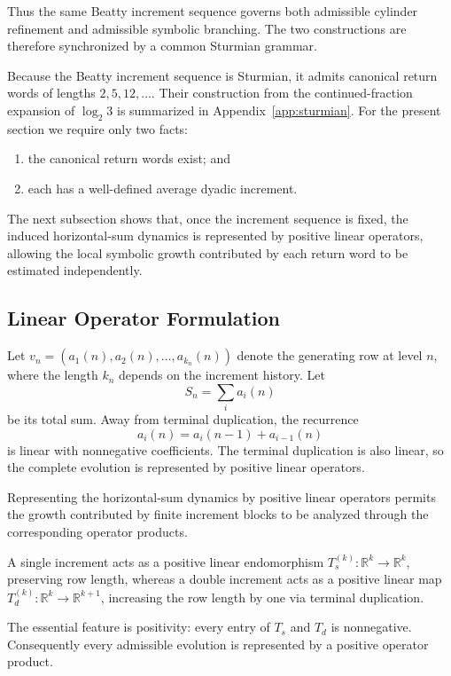 \documentclass[12pt, oneside]{article}
\numberwithin{equation}{section}
\theoremstyle{definition}
\theoremstyle{plain}
\theoremstyle{remark}
\begin{document}
Thus the same Beatty increment sequence governs both admissible cylinder
refinement and admissible symbolic branching. The two constructions are
therefore synchronized by a common Sturmian grammar.

Because the Beatty increment sequence is Sturmian, it admits canonical
return words of lengths \(2,5,12,\ldots\). Their construction from the
continued-fraction expansion of \(\log_2 3\) is summarized in
Appendix~\ref{app:sturmian}. For the present section we require only two
facts:

\begin{enumerate}
\item the canonical return words exist; and
\item each has a well-defined average dyadic increment.
\end{enumerate}

The next subsection shows that, once the increment sequence is fixed,
the induced horizontal-sum dynamics is represented by positive linear
operators, allowing the local symbolic growth contributed by each return
word to be estimated independently.

\subsection{Linear Operator Formulation}

Let $v_n = (a_1(n),a_2(n),\dots,a_{k_n}(n))$ denote the generating row at
level $n$, where the length $k_n$ depends on the increment history.
Let
\[
S_n = \sum_i a_i(n)
\]
be its total sum. Away from terminal duplication, the recurrence
\[
a_i(n)=a_i(n-1)+a_{i-1}(n)
\]
is linear with nonnegative coefficients. The terminal duplication is also
linear, so the complete evolution is represented by positive linear operators.

Representing the horizontal-sum dynamics by positive linear operators permits the
growth contributed by finite increment blocks to be analyzed through the corresponding
operator products.

A single increment acts as a positive linear endomorphism
$T_s^{(k)} : \mathbb{R}^{k} \to \mathbb{R}^{k}$, preserving row length, whereas
a double increment acts as a positive linear map
$T_d^{(k)} : \mathbb{R}^{k} \to \mathbb{R}^{k+1}$, increasing the row length by one
via terminal duplication.

The essential feature is positivity: every entry of \(T_s\) and \(T_d\) is nonnegative.
Consequently every admissible evolution is represented by a positive operator product.
\end{document}
